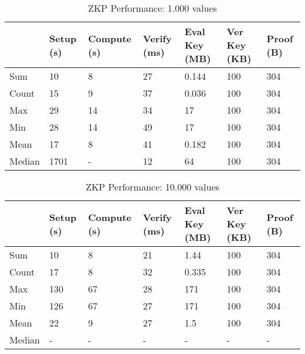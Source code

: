 \begin{table}[!htb]
\centering
\begin{tabular}{|l|l|l|l|l|l|l|}
\hline
 & Setup (s) & Compute (s) & Verify (ms) & Eval Key (MB) & Ver Key (KB) & Proof (B)  \\ \hline
 Sum & 10 & 8 & 27 & 0.144 & 100 & 304 \\ \hline
 Count & 15 & 9 & 37 & 0.036 & 100 & 304 \\ \hline
 Max & 29 & 14 & 34 & 17 & 100 & 304 \\ \hline
 Min & 28 & 14 & 49 & 17 & 100 & 304 \\ \hline
 Mean & 17 & 8 & 41 & 0.182 & 100 & 304 \\ \hline
 Median & 1701 & - & 12 & 64 & 100 & 304 \\ \hline
\end{tabular}
\captionsetup{format=hang, justification=centering}
\caption{ZKP Performance: 1.000 values}
\label{table:zkp_02}
\end{table}

\begin{table}[!htb]
\centering
\begin{tabular}{|l|l|l|l|l|l|l|}
\hline
 & Setup (s) & Compute (s) & Verify (ms) & Eval Key (MB) & Ver Key (KB) & Proof (B)  \\ \hline
 Sum & 10 & 8 & 21 & 1.44 & 100 & 304 \\ \hline
 Count & 17 & 8 & 32 & 0.335 & 100 & 304 \\ \hline
 Max & 130 & 67 & 28 & 171 & 100 & 304 \\ \hline
 Min & 126 & 67 & 27 & 171 & 100 & 304 \\ \hline
 Mean & 22 & 9 & 27 & 1.5 & 100 & 304 \\ \hline
 Median & - & - & - & - & - & - \\ \hline
\end{tabular}
\captionsetup{format=hang, justification=centering}
\caption{ZKP Performance: 10.000 values}
\label{table:zkp_03}
\end{table}
